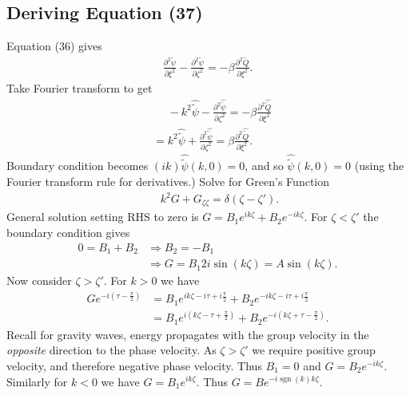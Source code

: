\documentclass[12pt]{article}
\DeclareMathOperator{\sgn}{sgn}
\begin{document}
\subsection{Deriving Equation (37)}
Equation (36) gives
\begin{align*}
\frac{\partial ^2 \tilde{\psi}}{\partial \xi^2} - \frac{\partial ^2 \tilde{\psi}}{\partial \zeta^2} = -\beta \frac{\partial^2 \tilde{Q}}{\partial \xi^2}.
\end{align*}
Take Fourier transform to get
\begin{align*}
& \phantom{=} -k^2 \widehat{\tilde{\psi}} - \frac{\partial ^2 \widehat{\tilde{\psi}}}{\partial \zeta^2} = -\beta \frac{\partial^2 \widehat{\tilde{Q}}}{\partial \xi^2} \\
&= k^2 \widehat{\tilde{\psi}} + \frac{\partial ^2 \widehat{\tilde{\psi}}}{\partial \zeta^2} = \beta \frac{\partial^2 \widehat{\tilde{Q}}}{\partial \xi^2}.
\end{align*}
Boundary condition becomes $\left(ik\right)\widehat{\tilde{\psi}}(k,0)=0$, and so $\widehat{\tilde{\psi}}(k,0)=0$ (using the Fourier transform rule for derivatives.) Solve for Green's Function
\begin{align*}
&\phantom{=} k^2 G + G_{\zeta\zeta} = \delta\left(\zeta-\zeta'\right).
\end{align*}
General solution setting RHS to zero is $G=B_1 e^{i k\zeta} + B_2 e^{-ik\zeta}$. For $\zeta < \zeta'$ the boundary condition gives
\begin{align*}
0=B_1+B_2 & \Rightarrow B_2 = -B_1 \\
& \Rightarrow G = B_1 2i \sin(k\zeta) = A \sin(k\zeta).
\end{align*}
Now consider $\zeta > \zeta'$. For $k>0$ we have
\begin{align*}
G e^{-i\left(\tau-\frac{\pi}{2}\right)} &= B_1 e^{i k\zeta-i\tau+i\frac{\pi}{2}} + B_2 e^{-ik\zeta-i\tau+i\frac{\pi}{2}} \\
&= B_1 e^{i \left(k\zeta-\tau+\frac{\pi}{2}\right)} + B_2 e^{-i\left(k\zeta+\tau-\frac{\pi}{2}\right)}.
\end{align*}
Recall for gravity waves, energy propagates with the group velocity in the \textit{opposite} direction to the phase velocity. As $\zeta>\zeta'$ we require positive group velocity, and therefore negative phase velocity. Thus $B_1=0$ and $G=B_2e^{-ik\zeta}$. Similarly for $k<0$ we have $G=B_1e^{ik\zeta}$. Thus $G=Be^{-i\sgn(k)k\zeta}$.
\end{document}
